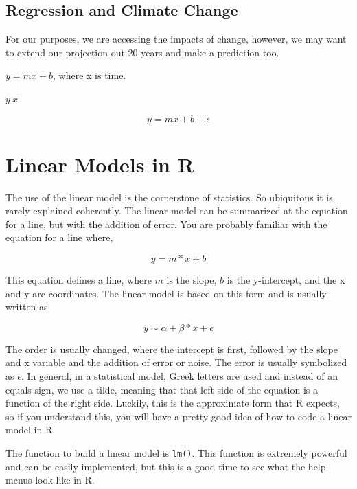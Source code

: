\documentclass{article}\usepackage[]{graphicx}\usepackage[]{color}
\begin{document}
\subsection{Regression and Climate Change}
For our purposes, we are accessing the impacts of change, however, we may want to extend our projection out 20 years and make a prediction too. 

$y =mx +b$, where x is time. 

$y ~ x$

\begin{equation}
y = mx + b + \epsilon
\end{equation}



\section{Linear Models in R}

The use of the linear model is the cornerstone of statistics. So ubiquitous it is rarely explained coherently. The linear model can be summarized at the equation for a line, but with the addition of error. You are probably familiar with the equation for a line where, 

\begin{equation}
y = m * x + b
\end{equation}

This equation defines a line, where $m$ is the slope, $b$ is the y-intercept, and the x and y are coordinates. The linear model is based on this form and is usually written as  

\begin{equation}
y \sim \alpha + \beta * x + \epsilon
\end{equation}

The order is usually changed, where the intercept is first, followed by the slope and x variable and the addition of error or noise. The error is usually symbolized as $\epsilon$. In general, in a statistical model, Greek letters are used and instead of an equals sign, we use a tilde, meaning that that left side of the equation is a function of the right side. Luckily, this is the approximate form that R expects, so if you understand this, you will have a pretty good idea of how to code a linear model in R. 

The function to build a linear model is \texttt{lm()}. This function is extremely powerful and can be easily implemented, but this is a good time to see what the help menus look like in R. 
\end{document}
